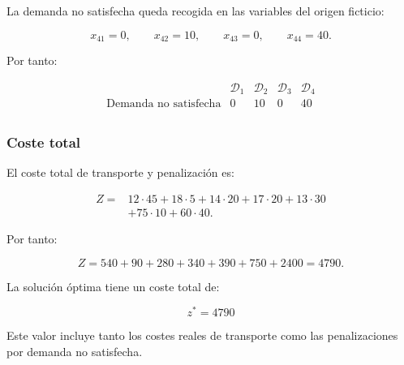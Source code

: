 La demanda no satisfecha queda recogida en las variables del origen ficticio:

\[
x_{41}=0, \qquad x_{42}=10, \qquad x_{43}=0, \qquad x_{44}=40.
\]

Por tanto:

\[
\begin{array}{c|cccc}
 & \mathcal{D}_1 & \mathcal{D}_2 & \mathcal{D}_3 & \mathcal{D}_4 \\
\hline
\text{Demanda no satisfecha} & 0 & 10 & 0 & 40 \\
\end{array}
\]

\subsubsection*{Coste total}

El coste total de transporte y penalización es:

\[
\begin{aligned}
Z ={}& 12\cdot 45 + 18\cdot 5 + 14\cdot 20 + 17\cdot 20 + 13\cdot 30 \\
&+ 75\cdot 10 + 60\cdot 40.
\end{aligned}
\]

Por tanto:

\[
Z = 540+90+280+340+390+750+2400 = 4790.
\]

La solución óptima tiene un coste total de:

\[
{z^*=4790}
\]

Este valor incluye tanto los costes reales de transporte como las penalizaciones por demanda no satisfecha.